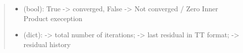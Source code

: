 \documentclass[a4paper,10pt,english]{sphinxmanual}
\begin{document}
\begin{fulllineitems}
\begin{quote}
\begin{description}
\begin{itemize}
\item {} 
 (bool): True -\textgreater{} converged, False -\textgreater{} Not converged / Zero Inner Product exeception

\item {} 
 (dict):  -\textgreater{} total number of iterations;  -\textgreater{} last residual in TT format;  -\textgreater{} residual history

\end{itemize}


\end{description}\end{quote}

\end{fulllineitems}

\end{document}
